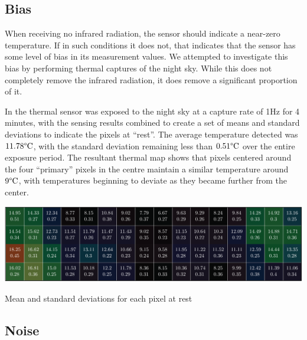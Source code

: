 \documentclass[../thesis/thesis.tex]{subfiles}
\begin{document}
\subsection{Bias}
When receiving no infrared radiation, the sensor should indicate a near-zero temperature. If in such conditions it does not, that indicates that the sensor has some level of bias in its measurement values. We attempted to investigate this bias by performing thermal captures of the night sky. While this does not completely remove the infrared radiation, it does remove a significant proportion of it.

In  the thermal sensor was exposed to the night sky at a capture rate of 1Hz for 4 minutes, with the sensing results combined to create a set of means and standard deviations to indicate the pixels at ``rest''. The average temperature detected was $11.78\degree\textrm{C}$, with the standard deviation remaining less than $0.51\degree\textrm{C}$ over the entire exposure period. The resultant thermal map shows that pixels centered around the four ``primary'' pixels in the centre maintain a similar temperature around $9\degree\textrm{C}$, with temperatures beginning to deviate as they became further from the center.  

\begin{landscape}
\begin{table}
\centering
\includegraphics{../diagrams/sensor-bias-thermal-map.pdf}
\caption{Mean and standard deviations for each pixel at rest}
\label{tab:meanstd}
\end{table}
\end{landscape}


\subsection{Noise}
\end{document}
